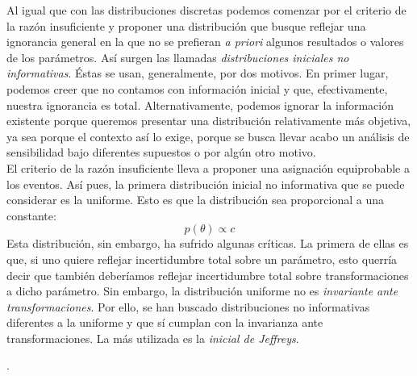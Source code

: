 Al igual que con las distribuciones discretas podemos comenzar por el criterio de la razón insuficiente y proponer una distribución que busque reflejar una ignorancia general en la que no se prefieran \textit{a priori} algunos resultados o valores de los parámetros. Así surgen las llamadas \textit{distribuciones iniciales no informativas}. Éstas se usan, generalmente, por dos motivos. En primer lugar, podemos creer que no contamos con información inicial y que, efectivamente, nuestra ignorancia es total. Alternativamente, podemos ignorar la información existente porque queremos presentar una distribución relativamente más objetiva, ya sea porque el contexto así lo exige, porque se busca llevar acabo un análisis de sensibilidad bajo diferentes supuestos o por algún otro motivo.\\ 

El criterio de la razón insuficiente lleva a proponer una asignación equiprobable a los eventos. Así pues, la primera distribución inicial no informativa que se puede considerar es la uniforme. Esto es que la distribución sea proporcional a una constante:
\begin{equation*}
p(\theta) \propto c
\end{equation*}
Esta distribución, sin embargo, ha sufrido algunas críticas. La primera de ellas es que, si uno quiere reflejar incertidumbre total sobre un parámetro, esto querría decir que también deberíamos reflejar incertidumbre total sobre transformaciones a dicho parámetro. Sin embargo, la distribución uniforme no es \textit{invariante ante transformaciones}. Por ello, se han buscado distribuciones no informativas diferentes a la uniforme y que sí cumplan con la invarianza ante transformaciones. La más utilizada es la \textit{inicial de Jeffreys}. 

.\\ 


